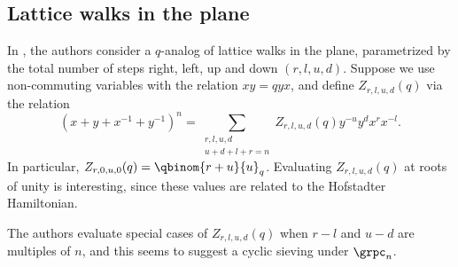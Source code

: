 \subsection[cspLatticeWalks]{Lattice walks in the plane}


In \cite{MashkevichOuvryPolychronakos2015}, the authors consider a $q$-analog of lattice walks in the plane,
parametrized by the total number of steps right, left, up and down $(r,l,u,d)$.
Suppose we use non-commuting variables with the relation $xy = qyx$,
and define $Z_{r,l,u,d}(q)$ via the relation
\[
(x+y+x^{-1}+y^{-1})^n = \sum_{\substack{r,l,u,d \\ u+d+l+r = n}} Z_{r,l,u,d}(q) y^{-u} y^{d} x^{r} x^{-l}.
\]
In particular, $Z_{r,0,u,0}(q) = \qbinom{r+u}{u}_q$.
Evaluating $Z_{r,l,u,d}(q)$ at roots of unity is interesting, since these values are related to the Hofstadter Hamiltonian.

The authors evaluate special cases of $Z_{r,l,u,d}(q)$ when $r-l$ and $u-d$ are multiples of $n$,
and this seems to suggest a cyclic sieving under $\grpc_n$.
